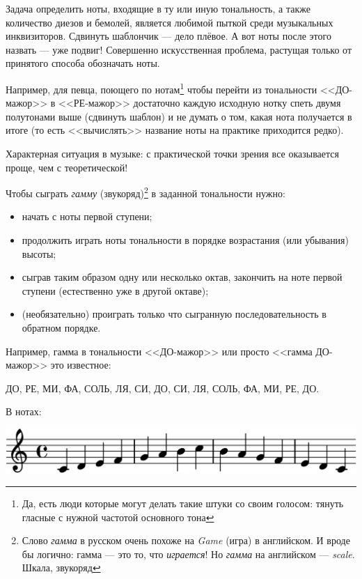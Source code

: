 Задача определить ноты, входящие в ту или иную тональность, а также количество диезов и бемолей, является любимой пыткой среди музыкальных инквизиторов. Сдвинуть шаблончик --- дело плёвое. А вот ноты после этого назвать --- уже подвиг! Совершенно искусственная проблема, растущая только от принятого способа обозначать ноты.

Например, для певца, поющего по нотам\footnote{Да, есть люди которые могут делать такие штуки со своим голосом: тянуть гласные с нужной частотой основного тона} чтобы перейти из тональности <<ДО-мажор>> в <<РЕ-мажор>> достаточно каждую исходную нотку спеть двумя полутонами выше (сдвинуть шаблон) и не думать о том, какая нота получается в итоге (то есть <<вычислять>> название ноты на практике приходится редко).

Характерная ситуация в музыке: с практической точки зрения все оказывается проще, чем с теоретической!

Чтобы сыграть \emph{гамму} (звукоряд)\footnote{Слово \emph{гамма} в русском очень похоже на \emph{Game} (игра) в английском. И вроде бы логично: гамма --- это то, что \emph{играется}! Но \emph{гамма} на английском --- \emph{scale}. Шкала, звукоряд} в заданной тональности нужно:
\begin{itemize}
    \item начать с ноты первой ступени;
    \item продолжить играть ноты тональности в порядке возрастания (или убывания) высоты;
    \item сыграв таким образом одну или несколько октав, закончить на ноте первой ступени (естественно уже в другой октаве); 
    \item (необязательно) проиграть только что сыгранную последовательность в обратном порядке.
\end{itemize}

Например, гамма в тональности <<ДО-мажор>> или просто <<гамма ДО-мажор>> это известное: 
\begin{center}
    ДО, РЕ, МИ, ФА, СОЛЬ, ЛЯ, СИ, ДО, СИ, ЛЯ, СОЛЬ, ФА, МИ, РЕ, ДО.
\end{center}

В нотах:
\begin{center}    
    \includegraphics{fig/notes/scale-diat-c-maj}
\end{center}    


